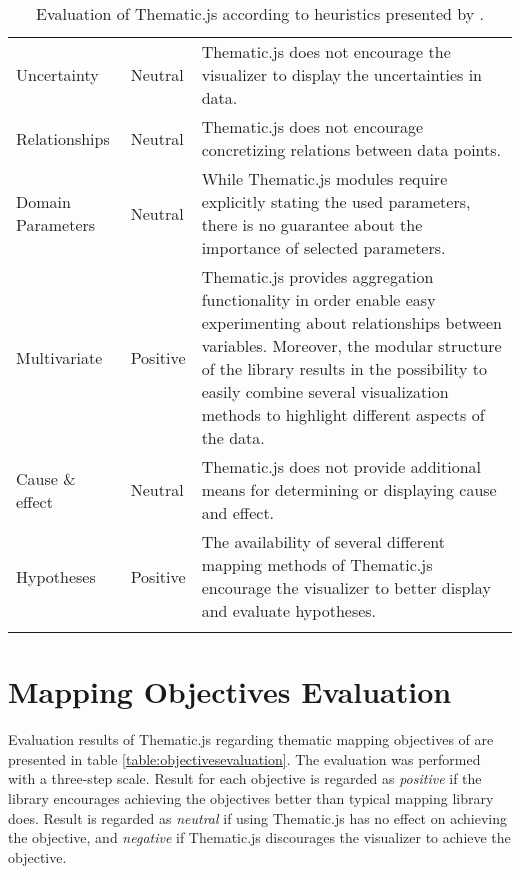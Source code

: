 \begin{longtable}{|p{3cm}|p{2.2cm}|p{7.8cm}|}
Uncertainty & Neutral & Thematic.js does not encourage the visualizer to display the uncertainties in data. \\[0.5em] %
Relationships & Neutral & Thematic.js does not encourage concretizing relations between data points. \\[0.5em] %
Domain Parameters & Neutral & While Thematic.js modules require explicitly stating the used parameters, there is no guarantee about the importance of selected parameters. \\[0.5em] %
Multivariate & Positive & Thematic.js provides aggregation functionality in order enable easy experimenting about relationships between variables. Moreover, the modular structure of the library results in the possibility to easily combine several visualization methods to highlight different aspects of the data. \\[0.5em] %
Cause \& effect & Neutral & Thematic.js does not provide additional means for determining or displaying cause and effect. \\[0.5em] %
Hypotheses & Positive & The availability of several different mapping methods of Thematic.js encourage the visualizer to better display and evaluate hypotheses. \\[0.5em] %
\hline
\caption{Evaluation of Thematic.js according to heuristics presented by \citet{zuk_heuristics_2006}.}
\label{table:heuristicsevaluation}
\end{longtable}

\chapter{Mapping Objectives Evaluation}
\label{appendix:objectivesevaluation}

Evaluation results of Thematic.js regarding thematic mapping objectives of \citet{schlichtmann_visualization_2002} are presented in table \ref{table:objectivesevaluation}. The evaluation was performed with a three-step scale. Result for each objective is regarded as \emph{positive} if the library encourages achieving the objectives better than typical mapping library does. Result is regarded as \emph{neutral} if using Thematic.js has no effect on achieving the objective, and \emph{negative} if Thematic.js discourages the visualizer to achieve the objective.

